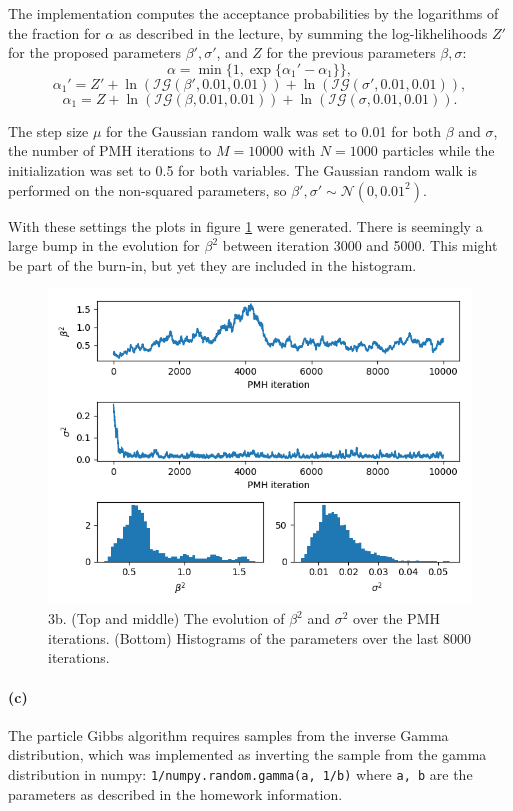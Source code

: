 \documentclass{article}
\begin{document}
The implementation computes the acceptance probabilities by the logarithms of the fraction for $\alpha$ as described in the lecture, by summing the log-likhelihoods $Z'$ for the proposed parameters $\beta', \sigma'$, and $Z$ for the previous parameters $\beta, \sigma$:
	\begin{equation}
		\alpha = \min\{ 1, \exp\{\alpha_1' - \alpha_1\}\},
	\end{equation}
	\begin{equation}
		\alpha_1' = Z' + \ln(\mathcal{IG}(\beta', 0.01, 0.01)) + \ln(\mathcal{IG}(\sigma', 0.01, 0.01)),
	\end{equation}
	\begin{equation}
		\alpha_1 = Z + \ln(\mathcal{IG}(\beta, 0.01, 0.01)) + \ln(\mathcal{IG}(\sigma, 0.01, 0.01)).
	\end{equation}

The step size $\mu$ for the Gaussian random walk was set to 0.01 for both $ \beta $ and $ \sigma $, the number of PMH iterations to $M=10000$ with $N=1000$ particles while the initialization was set to 0.5 for both variables. The Gaussian random walk is performed on the non-squared parameters, so $\beta', \sigma' \sim \mathcal{N}(0, 0.01^2)$.

With these settings the plots in figure \ref{fig:3_b} were generated.
There is seemingly a large bump in the evolution for $\beta^2$ between iteration 3000 and 5000.
This might be part of the burn-in, but yet they are included in the histogram.
\begin{figure}[h]
	\centering
	\includegraphics[width=0.7\linewidth]{3_b}
	\caption{3b. (Top and middle) The evolution of $\beta^2$ and $ \sigma^2 $ over the PMH iterations. (Bottom) Histograms of the parameters over the last 8000 iterations.}
	\label{fig:3_b}
\end{figure}

\paragraph{(c)} The particle Gibbs algorithm requires samples from the inverse Gamma distribution, which was implemented as inverting the sample from the gamma distribution in numpy: \texttt{1/numpy.random.gamma(a, 1/b)} where \texttt{a, b} are the parameters as described in the homework information.
\end{document}
